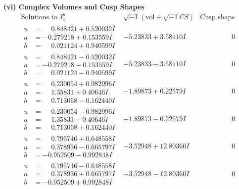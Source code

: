 \documentclass[1p]{elsarticle_modified}
\theoremstyle{definition}
\newcommand{\I}{\sqrt{-1}}
\begin{document}
\newpage\flushleft \textbf{(vi) Complex Volumes and Cusp Shapes}
$$\begin{array}{c|c|c}  
\text{Solutions to }I^u_{1}& \I (\text{vol} + \sqrt{-1}CS) & \text{Cusp shape}\\
 \hline 
\begin{aligned}
u &= \phantom{-}0.848421 + 0.520032 I \\
a &= -0.279218 + 0.153559 I \\
b &= \phantom{-}0.021124 + 0.940599 I\end{aligned}
 & -5.23833 + 3.58110 I & \phantom{-0.000000 } 0 \\ \hline\begin{aligned}
u &= \phantom{-}0.848421 - 0.520032 I \\
a &= -0.279218 - 0.153559 I \\
b &= \phantom{-}0.021124 - 0.940599 I\end{aligned}
 & -5.23833 - 3.58110 I & \phantom{-0.000000 } 0 \\ \hline\begin{aligned}
u &= \phantom{-}0.230054 + 0.982996 I \\
a &= \phantom{-}1.35831 + 0.40646 I \\
b &= \phantom{-}0.713068 - 0.162440 I\end{aligned}
 & -1.89873 + 0.22579 I & \phantom{-0.000000 } 0 \\ \hline\begin{aligned}
u &= \phantom{-}0.230054 - 0.982996 I \\
a &= \phantom{-}1.35831 - 0.40646 I \\
b &= \phantom{-}0.713068 + 0.162440 I\end{aligned}
 & -1.89873 - 0.22579 I & \phantom{-0.000000 } 0 \\ \hline\begin{aligned}
u &= \phantom{-}0.795746 + 0.648558 I \\
a &= \phantom{-}0.378936 - 0.665797 I \\
b &= -0.952509 - 0.992848 I\end{aligned}
 & -3.52948 + 12.80360 I & \phantom{-0.000000 } 0 \\ \hline\begin{aligned}
u &= \phantom{-}0.795746 - 0.648558 I \\
a &= \phantom{-}0.378936 + 0.665797 I \\
b &= -0.952509 + 0.992848 I\end{aligned}
 & -3.52948 - 12.80360 I & \phantom{-0.000000 } 0 \\ \hline\begin{aligned}

\end{aligned}
\end{array}$$
\end{document}
